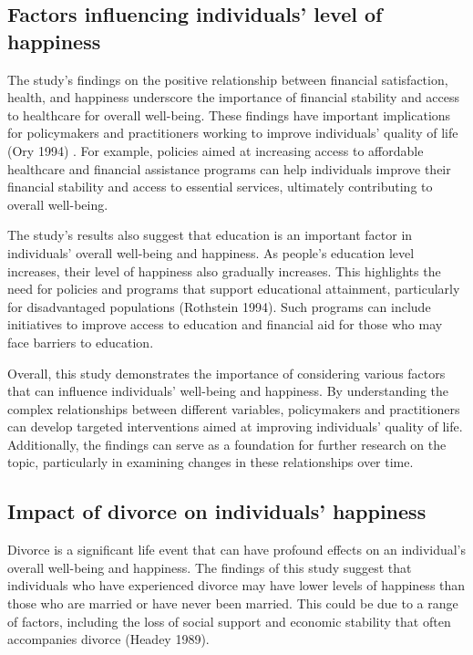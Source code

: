 \documentclass[
  letterpaper,
  DIV=11,
  numbers=noendperiod]{scrartcl}
\begin{document}
\hypertarget{factors-influencing-individuals-level-of-happiness}{%
\subsection{Factors influencing individuals' level of
happiness}\label{factors-influencing-individuals-level-of-happiness}}

The study's findings on the positive relationship between financial
satisfaction, health, and happiness underscore the importance of
financial stability and access to healthcare for overall well-being.
These findings have important implications for policymakers and
practitioners working to improve individuals' quality of life (Ory 1994)
. For example, policies aimed at increasing access to affordable
healthcare and financial assistance programs can help individuals
improve their financial stability and access to essential services,
ultimately contributing to overall well-being.

The study's results also suggest that education is an important factor
in individuals' overall well-being and happiness. As people's education
level increases, their level of happiness also gradually increases. This
highlights the need for policies and programs that support educational
attainment, particularly for disadvantaged populations (Rothstein 1994).
Such programs can include initiatives to improve access to education and
financial aid for those who may face barriers to education.

Overall, this study demonstrates the importance of considering various
factors that can influence individuals' well-being and happiness. By
understanding the complex relationships between different variables,
policymakers and practitioners can develop targeted interventions aimed
at improving individuals' quality of life. Additionally, the findings
can serve as a foundation for further research on the topic,
particularly in examining changes in these relationships over time.

\hypertarget{impact-of-divorce-on-individuals-happiness}{%
\subsection{Impact of divorce on individuals'
happiness}\label{impact-of-divorce-on-individuals-happiness}}

Divorce is a significant life event that can have profound effects on an
individual's overall well-being and happiness. The findings of this
study suggest that individuals who have experienced divorce may have
lower levels of happiness than those who are married or have never been
married. This could be due to a range of factors, including the loss of
social support and economic stability that often accompanies divorce
(Headey 1989).
\end{document}
